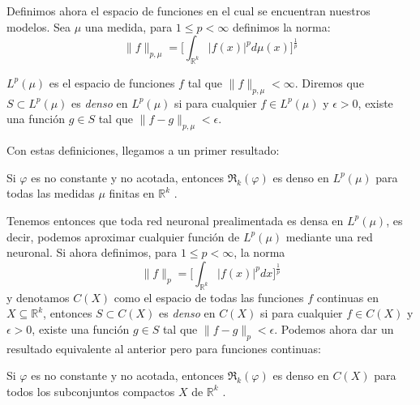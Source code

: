 Definimos ahora el espacio de funciones en el cual se encuentran nuestros modelos. Sea $\mu$ una medida, para 
$1\leq p<\infty$ definimos la norma:
\begin{equation}
    \|f\|_{p,\mu}=\Big[\int_{\mathbb{R}^k}|f(x)|^pd\mu(x)\Big]^{\frac 1p}
\end{equation}

\begin{definicion}$L^p(\mu)$ es el espacio de funciones $f$ tal que $\|f\|_{p,\mu}<\infty$. Diremos que 
$S\subset L^p(\mu)$ es \textit{denso} en $L^p(\mu)$ si para cualquier $f\in L^p(\mu)$ y $\epsilon>0$, existe una función
$g\in S$ tal que $\|f-g\|_{p,\mu}<\epsilon$.
\end{definicion}

Con estas definiciones, llegamos a un primer resultado:

\begin{teorema}Si $\varphi$ es no constante y no acotada, entonces $\mathfrak{R}_k(\varphi)$ es denso en $L^p(\mu)$ 
para todas las medidas $\mu$ finitas en $\mathbb{R}^k$ \cite{hornik_1991}.
\end{teorema}

Tenemos entonces que toda red neuronal prealimentada es densa en $L^p(\mu)$, es decir, podemos aproximar cualquier
función de $L^p(\mu)$ mediante una red neuronal. Si ahora definimos, para $1\leq p<\infty$, la norma
\begin{equation}
    \|f\|_p=\Big[\int_{\mathbb{R}^k}|f(x)|^pdx\Big]^{\frac 1p}
\end{equation}
y denotamos $C(X)$ como el espacio de todas las funciones $f$ continuas en $X\subseteq\mathbb{R}^k$, entonces 
$S\subset C(X)$ es \textit{denso} en $C(X)$ si para cualquier $f\in C(X)$ y $\epsilon>0$, existe una función $g\in S$ 
tal que $\|f-g\|_p<\epsilon$. Podemos ahora dar un resultado equivalente al anterior pero para funciones continuas:

\begin{teorema}Si $\varphi$ es no constante y no acotada, entonces $\mathfrak{R}_k(\varphi)$ es denso en $C(X)$
para todos los subconjuntos compactos $X$ de $\mathbb{R}^k$ \cite{hornik_1991}.
\end{teorema}

